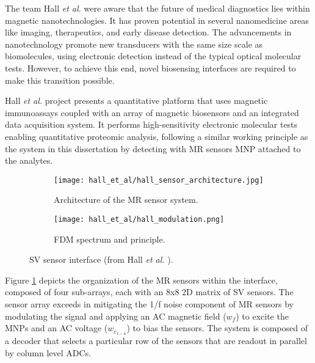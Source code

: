 The team Hall \textit{et al.} \cite{PMID24761029} were aware that the future of medical diagnostics lies within magnetic nanotechnologies. It has proven potential in several nanomedicine areas like imaging, therapeutics, and early disease detection. The advancements in nanotechnology promote new transducers with the same size scale as biomolecules, using electronic detection instead of the typical optical molecular tests. However, to achieve this end, novel biosensing interfaces are required to make this transition possible.

Hall \textit{et al.} project presents a quantitative platform that uses magnetic immunoassays coupled with an array of magnetic biosensors and an integrated data acquisition system. It performs high-sensitivity electronic molecular tests enabling quantitative proteomic analysis, following a similar working principle as the system in this dissertation by detecting with \ac{MR} sensors \ac{MNP} attached to the analytes.

\begin{figure}[!ht]
    \centering
    \begin{subfigure}[b]{.49\textwidth}
        \centering
        \texttt{[image: hall\_et\_al/hall\_sensor\_architecture.jpg]}
        \caption{Architecture of the MR sensor system.}
        \label{figure:hall-sensor}
    \end{subfigure}
    \hfill
    \centering
    \begin{subfigure}[b]{.49\textwidth}
        \centering
        \texttt{[image: hall\_et\_al/hall\_modulation.png]}
        \caption{FDM spectrum and principle.}
        \label{figure:hall-modulation}
    \end{subfigure}
    \caption{SV sensor interface (from Hall \textit{et al.} \cite{PMID24761029}).}
    \label{figure:hall-sensor-interface}
\end{figure}

Figure \ref{figure:hall-sensor} depicts the organization of the \ac{MR} sensors within the interface, composed of four sub-arrays, each with an 8x8 \ac{2D} matrix of \ac{SV} sensors. The sensor array exceeds in mitigating the 1/f noise component of \ac{MR} sensors by modulating the signal and applying an \ac{AC} magnetic field ($w_f$) to excite the \ac{MNP}s and an \ac{AC} voltage ($w_{c_{1-4}}$) to bias the sensors. The system is composed of a decoder that selects a particular row of the sensors that are readout in parallel by column level \ac{ADC}s.

